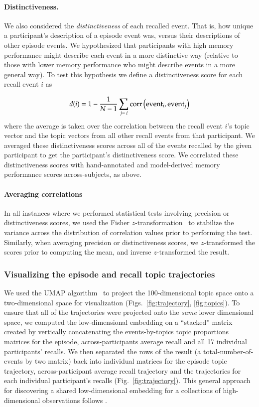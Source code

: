 \documentclass{article}
\begin{document}
\paragraph*{Distinctiveness.}
We also considered the \textit{distinctiveness} of each recalled event. That is, how unique a participant's description of a episode event was, versus their descriptions of other episode events.  We hypothesized that participants with high memory performance might describe each event in a more distinctive way (relative to those with lower memory performance who might describe events in a more general way).  To test this hypothesis we define a distinctiveness score for each recall event $i$ as

\[
  d(i) = 1 - \frac{1}{N - 1} \sum_{j = \\i}\mathrm{corr}\left(\mathrm{event}_i, \mathrm{event}_j\right) 
\]
where the average is taken over the correlation between the recall event $i$'s topic vector and the topic vectors from all other recall events from that participant.  We averaged these distinctiveness scores across all of the events recalled by the given participant to get the participant's distinctiveness score.  We correlated these distinctiveness scores with hand-annotated and model-derived memory performance scores across-subjects, as above.

\paragraph*{Averaging correlations}
In all instances where we performed statistical tests involving precision or distinctiveness scores, we used the Fisher $z$-transformation~\citep{Fish25} to stabilize the variance across the distribution of correlation values prior to performing the test.  Similarly, when averaging precision or distinctiveness scores, we $z$-transformed the scores prior to computing the mean, and inverse $z$-transformed the result.

\subsubsection*{Visualizing the episode and recall topic trajectories}
We used the UMAP algorithm~\citep{McInEtal18} to project the 100-dimensional topic space onto a two-dimensional space for visualization (Figs.~\ref{fig:trajectory}, \ref{fig:topics}).  To ensure that all of the trajectories were projected onto the \textit{same} lower dimensional space, we computed the low-dimensional embedding on a ``stacked'' matrix created by vertically concatenating the events-by-topics topic proportions matrices for the episode, across-participants average recall and all 17 individual participants' recalls.  We then separated the rows of the result (a total-number-of-events by two matrix) back into individual matrices for the episode topic trajectory, across-participant average recall trajectory and the trajectories for each individual participant's recalls (Fig.~\ref{fig:trajectory}).  This general approach for discovering a shared low-dimensional embedding for a collections of high-dimensional observations follows \cite{HeusEtal18a}.
\end{document}
